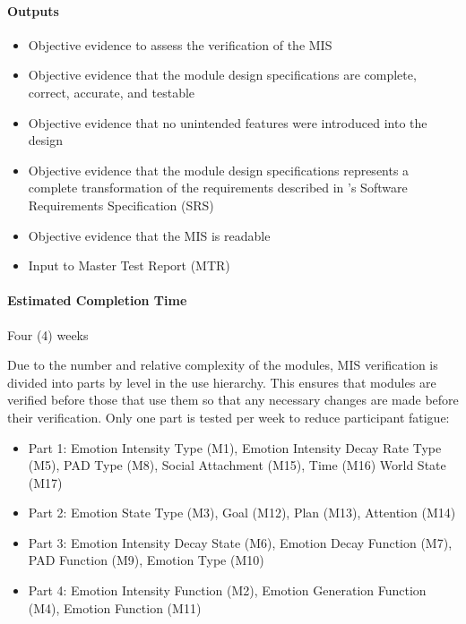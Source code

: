 \paragraph{Outputs}
\begin{itemize}

    \item Objective evidence to assess the verification of the MIS

    \item Objective evidence that the module design specifications are
    complete, correct, accurate, and testable

    \item Objective evidence that no unintended features were introduced into
    the design

    \item Objective evidence that the module design specifications represents a
    complete transformation of the requirements described in \progname{}'s
    Software Requirements Specification (SRS)

    \item Objective evidence that the MIS is readable

    \item Input to Master Test Report (MTR)

\end{itemize}

\paragraph{Estimated Completion Time} Four (4) weeks

Due to the number and relative complexity of the modules, MIS verification is
divided into parts by level in the use hierarchy. This ensures that modules are
verified before those that use them so that any necessary changes are made
before their verification. Only one part is tested per week to reduce
participant fatigue:
\begin{itemize}

    \item Part 1: Emotion Intensity Type (M1), Emotion Intensity Decay Rate
    Type (M5), PAD Type (M8), Social Attachment (M15), Time (M16) World State
    (M17)

    \item Part 2: Emotion State Type (M3), Goal (M12), Plan (M13), Attention
    (M14)

    \item Part 3: Emotion Intensity Decay State (M6), Emotion Decay Function
    (M7), PAD Function (M9), Emotion Type (M10)

    \item Part 4: Emotion Intensity Function (M2), Emotion Generation Function
    (M4), Emotion Function (M11)

\end{itemize}

